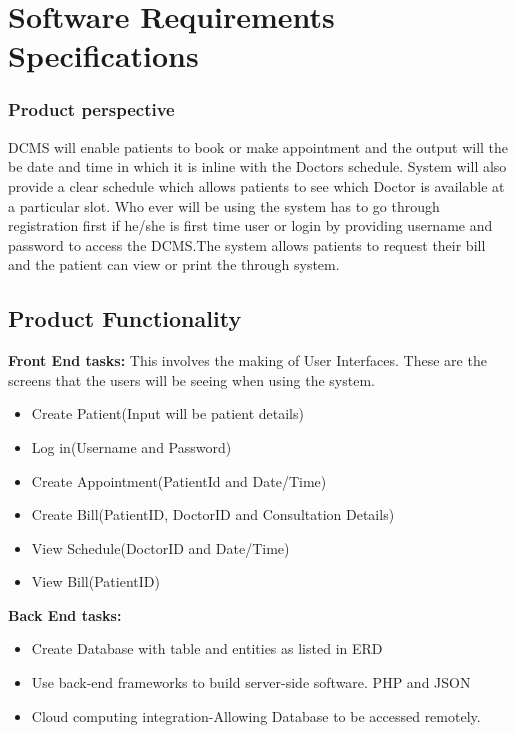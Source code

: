 \documentclass[11 pt]{article}
\begin{document}
\section{Software Requirements Specifications}

\subsubsection{Product perspective}
DCMS will enable patients to book or make appointment and the output will the be date and time in which it is inline with the Doctors schedule. System will
    also provide a clear schedule which allows patients to see
    which Doctor is available at a particular slot. Who ever
    will be using the system has to go through registration
    first if he/she is first time user or login by providing
    username and password to access the DCMS.The system allows patients to request their bill and the patient can view or print the through system.
\subsection{Product Functionality}
\textbf{Front End tasks:}
    This involves the making of User Interfaces. These are the screens that the users will be seeing when using the system.
    \begin{itemize}
    \item
    Create Patient(Input will be patient details)
    \item
    Log in(Username and Password)
    \item
    Create Appointment(PatientId and Date/Time)
    \item
    Create Bill(PatientID, DoctorID and Consultation Details)
    \item
    View Schedule(DoctorID and Date/Time)
    \item
    View Bill(PatientID)
    \end{itemize}
    \textbf{Back End tasks:}
    \begin{itemize}
    \item
    Create Database with table and entities as listed in ERD
    \item
    Use back-end frameworks to build server-side software. PHP and JSON    
    \item
    Cloud computing integration-Allowing Database to be accessed remotely.
    \end{itemize}
\end{document}
